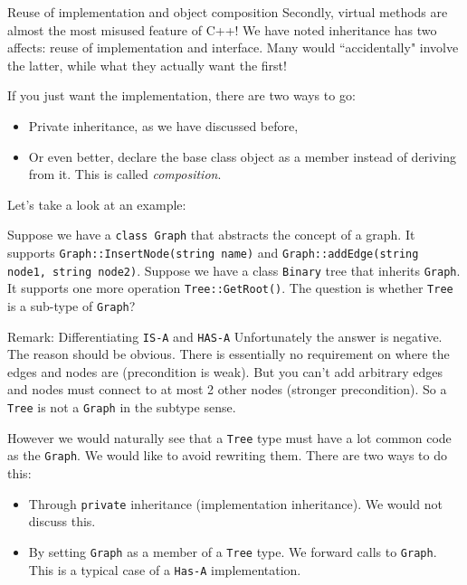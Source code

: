 \begin{frame}{Reuse of implementation and object composition}
Secondly, virtual methods are almost the most misused feature of C++! We have noted inheritance has two affects: reuse of implementation and interface. Many would ``accidentally" involve the latter, while what they actually want the first! 

If you just want the implementation, there are two ways to go:
\begin{itemize}
	\item Private inheritance, as we have discussed before,
	\item Or even better, declare the base class object as a member instead of deriving from it. This is called \textit{composition}.
\end{itemize}

Let's take a look at an example:

Suppose we have a \texttt{class Graph} that abstracts the concept of a graph. It supports \texttt{Graph::InsertNode(string name)} and \texttt{Graph::addEdge(string node1, string node2)}. Suppose we have a class \texttt{Binary} tree that inherits \texttt{Graph}. It supports one more operation \texttt{Tree::GetRoot()}. The question is whether \texttt{Tree} is a sub-type of \texttt{Graph}?
\end{frame}


\begin{frame}{Remark: Differentiating \texttt{IS-A} and \texttt{HAS-A}}
Unfortunately the answer is negative. The reason should be obvious. There is essentially no requirement on where the edges and nodes are (precondition is weak). But you can't add arbitrary edges and nodes must connect to at most 2 other nodes (stronger precondition). \alert{So a \texttt{Tree} is not a  \texttt{Graph} in the subtype sense}.

\vspace{0.1in}
However we would naturally see that a \texttt{Tree} type must have a lot common code as the \texttt{Graph}. We would like to avoid rewriting them. There are two ways to do this:
\begin{itemize}
	\item Through \texttt{private} inheritance (implementation inheritance). We would not discuss this.
	\item By setting \texttt{Graph} as a member of a \texttt{Tree} type. We forward calls to \texttt{Graph}. This is a typical case of a \texttt{Has-A} implementation.
\end{itemize} 
\end{frame}

